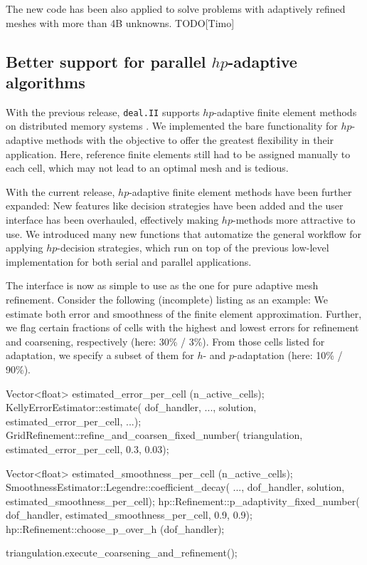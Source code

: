 \documentclass{ansarticle-preprint}
\newcommand{\specialword}[1]{\texttt{#1}}
\newcommand{\dealii}{{\specialword{deal.II}}\xspace}
\begin{document}
The new code has been also applied to solve problems with adaptively refined
meshes with more than 4B unknowns. {\color{red}TODO[Timo]}



\subsection{Better support for parallel $hp$-adaptive algorithms}
\label{subsec:hp}

With the previous release, \dealii supports $hp$-adaptive finite element methods
on distributed memory systems \cite{dealII91}. We implemented the bare functionality
for $hp$-adaptive methods with the objective to offer the greatest flexibility in
their application. Here, reference finite elements still had to be assigned manually
to each cell, which may not lead to an optimal mesh and is tedious.

With the current release, $hp$-adaptive finite element methods have been further
expanded: New features like decision strategies have been added and the user interface
has been overhauled, effectively making $hp$-methods more attractive to use. We introduced
many new functions that automatize the general workflow for applying $hp$-decision
strategies, which run on top of the previous low-level implementation for both serial
and parallel applications.

The interface is now as simple to use as the one for pure adaptive mesh refinement.
Consider the following (incomplete) listing as an example: We estimate both error and
smoothness of the finite element approximation. Further, we flag certain fractions of
cells with the highest and lowest errors for refinement and coarsening, respectively
(here: 30\% / 3\%). From those cells listed for adaptation, we specify a subset of them
for $h$- and $p$-adaptation (here: 10\% / 90\%).
\begin{c++}
Vector<float> estimated_error_per_cell (n_active_cells);
KellyErrorEstimator::estimate(
  dof_handler, ..., solution, estimated_error_per_cell, ...);
GridRefinement::refine_and_coarsen_fixed_number(
  triangulation, estimated_error_per_cell, 0.3, 0.03);

Vector<float> estimated_smoothness_per_cell (n_active_cells);
SmoothnessEstimator::Legendre::coefficient_decay(
  ..., dof_handler, solution, estimated_smoothness_per_cell);
hp::Refinement::p_adaptivity_fixed_number(
  dof_handler, estimated_smoothness_per_cell, 0.9, 0.9);
hp::Refinement::choose_p_over_h (dof_handler);

triangulation.execute_coarsening_and_refinement();
\end{c++}
\end{document}
